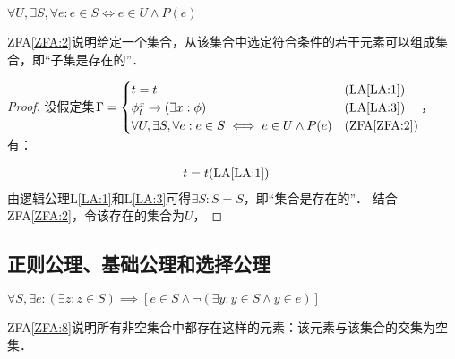 \begin{ZermeloFraenkelAxioms}[子集公理]\label{ZFA:2}
    $ \forall U, \exists S, \forall e: e \in S \iff e \in U \land P(e) $
\end{ZermeloFraenkelAxioms}
ZFA\ref{ZFA:2}说明给定一个集合，从该集合中选定符合条件的若干元素可以组成集合，即``子集是存在的''．

\begin{proof}
    设假定集$
        \Gamma = \begin{cases}
            t = t                                                            &\text{(LA\ref{LA:1})}   \\
            \phi^x_t \to (\exists x: \phi)                                   &\text{(LA\ref{LA:3})}   \\
            \forall U, \exists S, \forall e: e \in S \iff e \in U \land P(e) &\text{(ZFA\ref{ZFA:2})} \\
        \end{cases}
    $，有：
    
    \begin{align*}
        t = t &\text{(LA\ref{LA:1})}
    \end{align*}
    由逻辑公理L\ref{LA:1}和L\ref{LA:3}可得$ \exists S: S = S $，即``集合是存在的''．
    结合ZFA\ref{ZFA:2}，令该存在的集合为$U$，
\end{proof}

\begin{ZermeloFraenkelAxioms}[无序对公理]\label{ZFA:3}
\end{ZermeloFraenkelAxioms}

\begin{ZermeloFraenkelAxioms}[并集公理]\label{ZFA:4}
\end{ZermeloFraenkelAxioms}

\begin{ZermeloFraenkelAxioms}[幂集公理]\label{ZFA:5}
\end{ZermeloFraenkelAxioms}

\begin{ZermeloFraenkelAxioms}[无穷公理]\label{ZFA:6}
\end{ZermeloFraenkelAxioms}

\begin{ZermeloFraenkelAxioms}[替换公理]\label{ZFA:7}
\end{ZermeloFraenkelAxioms}

\subsection{正则公理、基础公理和选择公理}

\begin{ZermeloFraenkelAxioms}[正则公理]\label{ZFA:8}
    $ \forall S, \exists e: (\exists z: z \in S) \implies [e \in S \land \lnot(\exists y: y \in S \land y \in e)] $
\end{ZermeloFraenkelAxioms}
ZFA\ref{ZFA:8}说明所有非空集合中都存在这样的元素：该元素与该集合的交集为空集．
